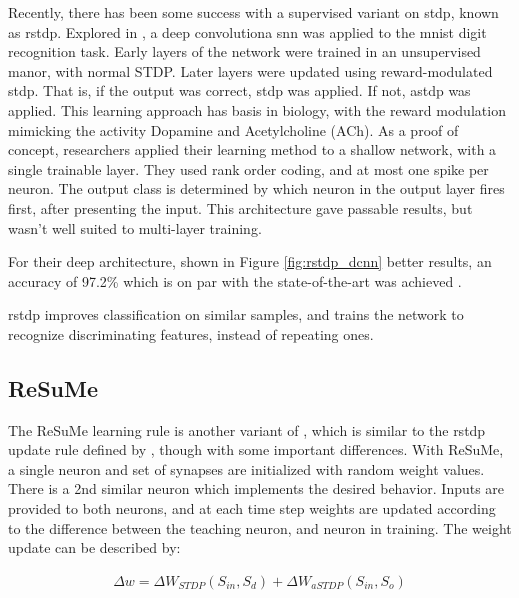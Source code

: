     Recently, there has been some success with a supervised variant on
    \Gls{stdp}, known as \gls{rstdp}. Explored in \parencite{mozafari_2018}, a
    deep convolutiona \gls{snn} was applied to the \Gls{mnist} digit recognition
    task. Early layers of the network were trained in an unsupervised manor,
    with normal STDP. Later layers were updated using reward-modulated
    \gls{stdp}. That is, if the output was correct, \Gls{stdp} was applied. If
    not, \gls{astdp} was applied. This learning approach has basis in biology,
    with the reward modulation mimicking the activity Dopamine and Acetylcholine
    (ACh). As a proof of concept, researchers applied their learning method to a
    shallow network, with a single trainable layer. They used rank order coding,
    and at most one spike per neuron. The output class is determined by which
    neuron in the output layer fires first, after presenting the input. This
    architecture gave passable results, but wasn't well suited to multi-layer
    training.
    
    For their deep architecture, shown in Figure \ref{fig:rstdp_dcnn} better
    results, an accuracy of 97.2\% which is on par with the state-of-the-art was
    achieved \parencite{mozafari_2018}.
    

    \gls{rstdp} improves classification on similar samples, and trains the network to
    recognize discriminating features, instead of repeating ones.

    \subsection{ReSuMe}
    The ReSuMe learning rule is another variant of , which is similar
    to the \gls{rstdp} update rule defined by \parencite{mozafari_2018}, though with some
    important differences. With ReSuMe, a single neuron and set of synapses are
    initialized with random weight values. There is a 2nd similar neuron
    which implements the desired behavior. Inputs are provided to both neurons,
    and at each time step weights are updated according to the difference
    between the teaching neuron, and neuron in training. The weight update can
    be described by:

    \begin{align}
      \Delta w = \Delta W_{STDP}(S_{in}, S_{d}) + \Delta W_{aSTDP}(S_{in}, S_{o}) \label{eq:resume_stdp}
    \end{align}

